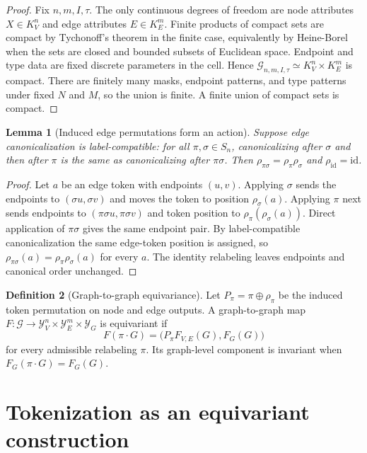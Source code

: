 \documentclass[11pt]{article}
\theoremstyle{definition}
\newtheorem{definition}{Definition}[section]
\theoremstyle{plain}
\newtheorem{lemma}[definition]{Lemma}
\theoremstyle{remark}
\numberwithin{equation}{section}
\newcommand{\G}{\mathcal{G}}
\newcommand{\Y}{\mathcal{Y}}
\begin{document}
\begin{proof}
Fix $n,m,I,\tau$.  The only continuous degrees of freedom are node attributes $X\in K_V^n$ and edge attributes $E\in K_E^m$.  Finite products of compact sets are compact by Tychonoff's theorem in the finite case, equivalently by Heine-Borel when the sets are closed and bounded subsets of Euclidean space.  Endpoint and type data are fixed discrete parameters in the cell.  Hence $\G_{n,m,I,\tau}\simeq K_V^n\times K_E^m$ is compact.  There are finitely many masks, endpoint patterns, and type patterns under fixed $N$ and $M$, so the union is finite.  A finite union of compact sets is compact.
\end{proof}

\begin{lemma}[Induced edge permutations form an action]
Suppose edge canonicalization is label-compatible: for all $\pi,\sigma\in S_n$, canonicalizing after $\sigma$ and then after $\pi$ is the same as canonicalizing after $\pi\sigma$.  Then $\rho_{\pi\sigma}=\rho_\pi\rho_\sigma$ and $\rho_{\mathrm{id}}=\mathrm{id}$.
\end{lemma}

\begin{proof}
Let $a$ be an edge token with endpoints $(u,v)$.  Applying $\sigma$ sends the endpoints to $(\sigma u,\sigma v)$ and moves the token to position $\rho_\sigma(a)$.  Applying $\pi$ next sends endpoints to $(\pi\sigma u,\pi\sigma v)$ and token position to $\rho_\pi(\rho_\sigma(a))$.  Direct application of $\pi\sigma$ gives the same endpoint pair.  By label-compatible canonicalization the same edge-token position is assigned, so $\rho_{\pi\sigma}(a)=\rho_\pi\rho_\sigma(a)$ for every $a$.  The identity relabeling leaves endpoints and canonical order unchanged.
\end{proof}

\begin{definition}[Graph-to-graph equivariance]
Let $P_\pi=\pi\oplus\rho_\pi$ be the induced token permutation on node and edge outputs.  A graph-to-graph map $F:\G\to\Y_V^n\times\Y_E^m\times\Y_G$ is equivariant if
\begin{equation}
  F(\pi\cdot G)=\bigl(P_\pi F_{V,E}(G),F_G(G)\bigr)
\end{equation}
for every admissible relabeling $\pi$.  Its graph-level component is invariant when $F_G(\pi\cdot G)=F_G(G)$.
\end{definition}

\section{Tokenization as an equivariant construction}
\end{document}
